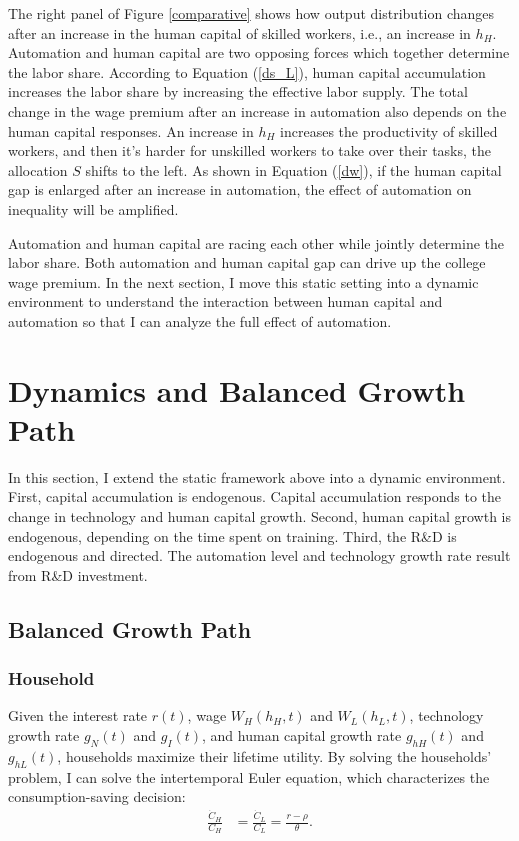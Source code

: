 \documentclass[12pt]{article}
\begin{document}
The right panel of Figure \ref{comparative} shows how output distribution changes after an increase in the human capital of skilled workers, i.e., an increase in $h_H$. Automation and human capital are two opposing forces which together determine the labor share. According to Equation (\ref{ds_L}), human capital accumulation increases the labor share by increasing the effective labor supply. The total change in the wage premium after an increase in automation also depends on the human capital responses. An increase in $h_H$ increases the productivity of skilled workers, and then it's harder for unskilled workers to take over their tasks, the allocation $S$ shifts to the left. As shown in Equation (\ref{dw}), if the human capital gap is enlarged after an increase in automation, the effect of automation on inequality will be amplified. 

Automation and human capital are racing each other while jointly determine the labor share. Both automation and human capital gap can drive up the college wage premium. In the next section, I move this static setting into a dynamic environment to understand the interaction between human capital and automation so that I can analyze the full effect of automation. 

\section{Dynamics and Balanced Growth Path}
In this section, I extend the static framework above into a dynamic environment. First, capital accumulation is endogenous. Capital accumulation responds to the change in technology and human capital growth. Second, human capital growth is endogenous, depending on the time spent on training. Third, the R\&D is endogenous and directed. The automation level and technology growth rate result from R\&D investment.

\subsection{Balanced Growth Path}
\subsubsection*{Household}
Given the interest rate $r(t)$, wage $W_H(h_H,t)$ and $W_L(h_L,t)$, technology growth rate $g_N(t)$ and $g_I(t)$, and human capital growth rate $g_{hH}(t)$ and  $g_{hL}(t)$, households maximize their lifetime utility. By solving the households' problem, I can solve the intertemporal Euler equation, which characterizes the consumption-saving decision: 
\begin{align*}
\frac{\dot{C}_H}{C_H} &= \frac{\dot{C}_L}{C_L}  = \frac{r-\rho}{\theta}.
\end{align*}
\end{document}

